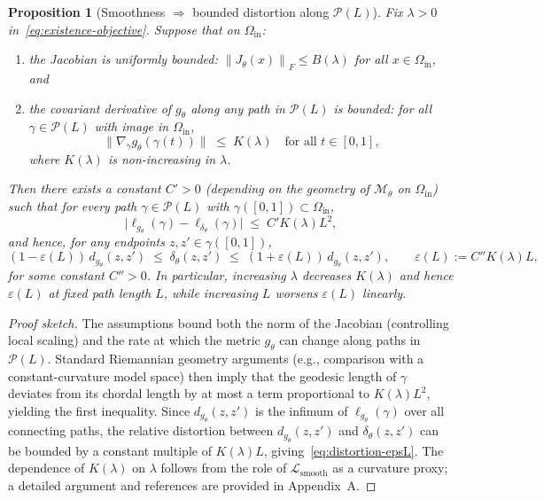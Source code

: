 \documentclass[11pt]{article}
\newcommand{\norm}[1]{\left\lVert #1 \right\rVert}
\newtheorem{proposition}{Proposition}
\begin{document}
\begin{proposition}[Smoothness $\Rightarrow$ bounded distortion along $\mathcal{P}(L)$]
\label{prop:smoothness-distortion}
Fix $\lambda > 0$ in~\eqref{eq:existence-objective}. Suppose that on $\Omega_{\mathrm{in}}$:
\begin{enumerate}[label=(C\arabic*),leftmargin=*]
  \item the Jacobian is uniformly bounded:
    $\norm{J_\theta(x)}_F \le B(\lambda)$ for all $x \in \Omega_{\mathrm{in}}$, and
  \item the covariant derivative of $g_\theta$ along any path in $\mathcal{P}(L)$ is bounded:
    for all $\gamma \in \mathcal{P}(L)$ with image in $\Omega_{\mathrm{in}}$,
    \[
      \bigl\| \nabla_{\dot\gamma} g_\theta(\gamma(t)) \bigr\|
      \;\le\; K(\lambda)
      \quad \text{for all } t \in [0,1],
    \]
    where $K(\lambda)$ is non-increasing in $\lambda$.
\end{enumerate}
Then there exists a constant $C' > 0$ (depending on the geometry of $\mathcal{M}_\theta$ on
$\Omega_{\mathrm{in}}$) such that for every path $\gamma \in \mathcal{P}(L)$ with
$\gamma([0,1]) \subset \Omega_{\mathrm{in}}$,
\[
\bigl| \ell_{g_\theta}(\gamma) - \ell_{\delta_\theta}(\gamma) \bigr|
\;\le\; C' K(\lambda) L^2,
\]
and hence, for any endpoints $z,z' \in \gamma([0,1])$,
\begin{equation}
\label{eq:distortion-epsL}
(1 - \varepsilon(L)) \, d_{g_\theta}(z,z')
\;\le\;
\delta_\theta(z,z')
\;\le\;
(1 + \varepsilon(L)) \, d_{g_\theta}(z,z'),
\qquad
\varepsilon(L) := C'' K(\lambda) L,
\end{equation}
for some constant $C''>0$. In particular, increasing $\lambda$ decreases $K(\lambda)$ and hence
$\varepsilon(L)$ at fixed path length $L$, while increasing $L$ worsens $\varepsilon(L)$ linearly.
\end{proposition}

\begin{proof}[Proof sketch]
The assumptions bound both the norm of the Jacobian (controlling local scaling) and the rate at
which the metric $g_\theta$ can change along paths in $\mathcal{P}(L)$. Standard Riemannian
geometry arguments (e.g., comparison with a constant-curvature model space) then imply that the
geodesic length of $\gamma$ deviates from its chordal length by at most a term proportional to
$K(\lambda) L^2$, yielding the first inequality. Since $d_{g_\theta}(z,z')$ is the infimum of
$\ell_{g_\theta}(\gamma)$ over all connecting paths, the relative distortion between
$d_{g_\theta}(z,z')$ and $\delta_\theta(z,z')$ can be bounded by a constant multiple of
$K(\lambda) L$, giving~\eqref{eq:distortion-epsL}. The dependence of $K(\lambda)$ on $\lambda$
follows from the role of $\mathcal{L}_{\mathrm{smooth}}$ as a curvature proxy; a detailed argument and
references are provided in Appendix~A.
\end{proof}
\end{document}

